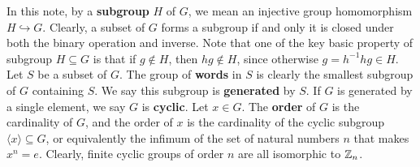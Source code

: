 \documentclass{report}
\begin{document}
 
In this note, by a \textbf{subgroup} $H$ of $G$, we mean an injective group homomorphism $H \hookrightarrow G $. Clearly, a subset of $G$ forms a subgroup if and only it is closed under both the binary operation and inverse. Note that one of the key basic property of subgroup $H \subseteq G$ is that if $g \not \in H$, then $hg \not \in H$, since otherwise $g=h^{-1}hg \in H$. \\







Let $S$ be a subset of $G$. The group of \textbf{words} in $S$ is clearly the smallest subgroup of $G$ containing $S$. We say this subgroup is \textbf{generated} by $S$. If $G$ is generated by a single element, we say $G$ is \textbf{cyclic}. Let $x \in G$. The \textbf{order} of $G$ is the cardinality of $G$, and the order of  $x$ is the cardinality of the cyclic subgroup $\langle x\rangle \subseteq G$, or equivalently the infimum of the set of natural numbers $n$ that makes $x^n=e$. Clearly, finite cyclic groups of order $n$ are all isomorphic to  $\mathbb{Z}_n$.  \\
\end{document}
